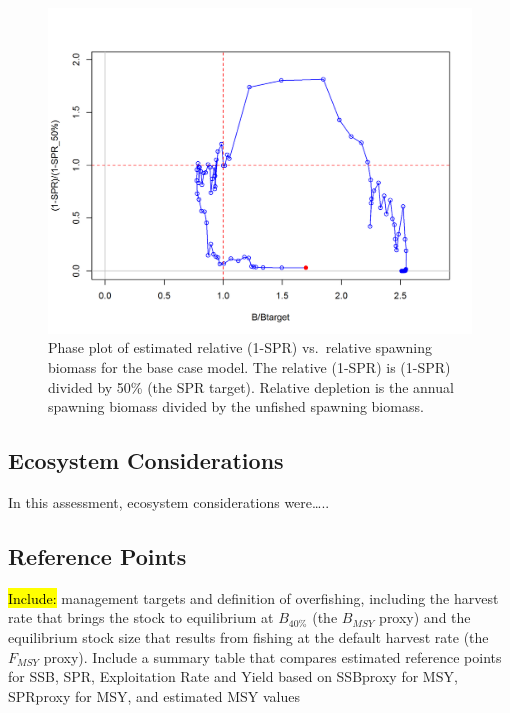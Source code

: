 \documentclass[12pt,]{article}
\begin{document}
\begin{figure}
\centering
\includegraphics{r4ss/plots_mod1/SPR4_phase.png}
\caption{Phase plot of estimated relative (1-SPR) vs.~relative spawning
biomass for the base case model. The relative (1-SPR) is (1-SPR) divided
by 50\% (the SPR target). Relative depletion is the annual spawning
biomass divided by the unfished spawning biomass. \label{fig:Phase_all}}
\end{figure}

\FloatBarrier

\subsection*{Ecosystem Considerations}\label{ecosystem-considerations}

In this assessment, ecosystem considerations were\ldots{}..

\subsection*{Reference Points}\label{reference-points}

\hl{Include:} management targets and definition of overfishing,
including the harvest rate that brings the stock to equilibrium at
\(B_{40\%}\) (the \(B_{MSY}\) proxy) and the equilibrium stock size that
results from fishing at the default harvest rate (the \(F_{MSY}\)
proxy). Include a summary table that compares estimated reference points
for SSB, SPR, Exploitation Rate and Yield based on SSBproxy for MSY,
SPRproxy for MSY, and estimated MSY values
\end{document}
